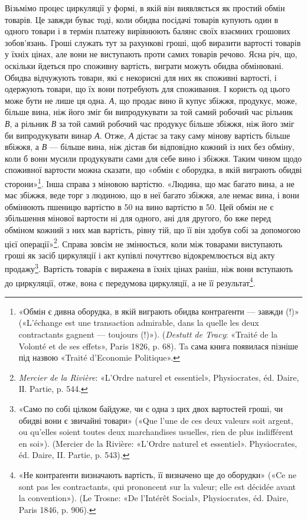 Візьмімо процес циркуляції у формі, в якій він виявляється
як простий обмін товарів. Це завжди буває тоді, коли обидва
посідачі товарів купують один в одного товари і в термін платежу
вирівнюють балянс своїх взаємних грошових зобов’язань. Гроші
служать тут за рахункові гроші, щоб виразити вартості товарів
у їхніх цінах, але вони не виступають проти самих товарів речово.
Ясна річ, що, оскільки йдеться про споживну вартість,
виграти можуть обидва обмінювані. Обидва відчужують товари,
які є некорисні для них як споживні вартості, і одержують товари,
що їх вони потребують для споживання. І користь од цього може
бути не лише ця одна. \emph{А}, що продає вино й купує збіжжя, продукує,
може, більше вина, ніж його зміг би випродукувати за той
самий робочий час рільник \emph{В}, а рільник \emph{В} за той самий робочий
час продукує більше збіжжя, ніж його зміг би випродукувати
винар \emph{А}. Отже, \emph{А} дістає за таку саму мінову вартість більше
вбіжжя, а \emph{В} — більше вина, ніж дістав би відповідно кожний
із них без обміну, коли б вони мусили продукувати сами для себе
вино і збіжжя. Таким чином щодо споживної вартости можна
сказати, що «обмін є оборудка, в якій виграють обидві сторони»\footnote{
«Обмін є дивна оборудка, в якій виграють обидва контраґенти —
завжди (!)» («L’échange est une transaction admirable, dans la quelle les
deux contractants gagnent — toujours (!)»). (\emph{Destutt de Tracy}: «Traité de
la Volonté et de ses effets», Paris 1826, p. 68). Ta сама книга появилася пізніше
під назвою «Traité d’Economie Politique».
}.
Інша справа з міновою вартістю. «Людина, що має багато вина,
а не має збіжжя, веде торг з людиною, що в неї багато збіжжя,
але немає вина, і вони обмінюють пшеницю вартістю в 50 на
вино вартістю в 50. Цей обмін не є збільшення мінової вартости
ні для одного, ані для другого, бо вже перед обміном кожний
з них мав вартість, рівну тій, що її він здобув собі за допомогою
цієї операції»\footnote{
\emph{Mercier de la Rivière}: «L’Ordre naturel et essentiel», Physiocrates, éd.
Daire, IІ. Partie, p. 544.
}. Справа зовсім не змінюється, коли між товарами
виступають гроші як засіб циркуляції і акт купівлі почуттєво
відокремлюється від акту продажу\footnote{
«Само по собі цілком байдуже, чи є одна з цих двох вартостей
гроші, чи обидві вони є звичайні товари» («Que l’une de ces deux valeurs
soit argent, ou qu’elles soient toutes deux marchandises usuelles, rien de
plus indifférent en soi»). (Mercier de la Rivière: «L’Ordre naturel et essentiel».
Physiocrates, éd. Daire, II. Partie, p. 543).
}. Вартість товарів є виражена
в їхніх цінах раніш, ніж вони вступають до циркуляції, отже,
вона є передумова циркуляції, а не її результат\footnote{
«Не контраґенти визначають вартість, її визначено ще до оборудки»
(«Ce ne sont pas les contractants, qui prononcent sur la valeur; elle est
décidée avant la convention»). (Le Trosne: «De l’Intérêt Social», Physiocrates,
éd. Daire, Paris 1846, p. 906).
}.

